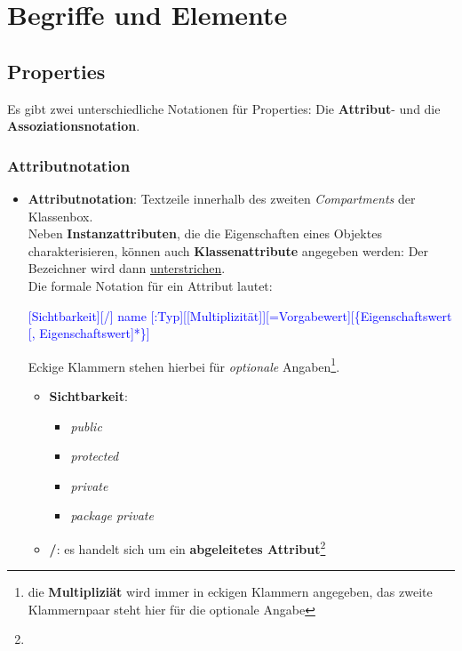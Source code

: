 \section{Begriffe und Elemente}

\subsection{Properties}
Es gibt zwei unterschiedliche Notationen für Properties: Die \textbf{Attribut}- und die \textbf{Assoziationsnotation}.

\subsubsection*{Attributnotation}

\begin{itemize}
    \item \textbf{Attributnotation}: Textzeile innerhalb des zweiten \textit{Compartments} der Klassenbox.\\
    Neben \textbf{Instanzattributen}, die die Eigenschaften eines Objektes charakterisieren, können auch \textbf{Klassenattribute} angegeben werden: Der Bezeichner wird dann \underline{unterstrichen}.\\
    Die formale Notation für ein Attribut lautet:\\
    \medskip
     \noindent
    \begin{small}
        \textcolor{blue}{[Sichtbarkeit][/] name [:Typ][[Multiplizität]][=Vorgabewert][\{Eigenschaftswert [, Eigenschaftswert]*\}]}\\
    \end{small}
    \noindent
    Eckige Klammern stehen hierbei für \textit{optionale} Angaben\footnote{
        die \textbf{Multipliziät} wird immer in eckigen Klammern angegeben, das zweite Klammernpaar steht hier für die optionale Angabe
    }.
    \begin{itemize}
        \item \textbf{Sichtbarkeit}:
            \begin{itemize}
                \item \code{+} \textit{public}
                \item \code{#} \textit{protected}
                \item \code{-} \textit{private}
                \item \code{~} \textit{package private}
            \end{itemize}
        \item \textbf{/}: es handelt sich um ein \textbf{abgeleitetes Attribut}\footnote{
}
\end{itemize}
\end{itemize}
